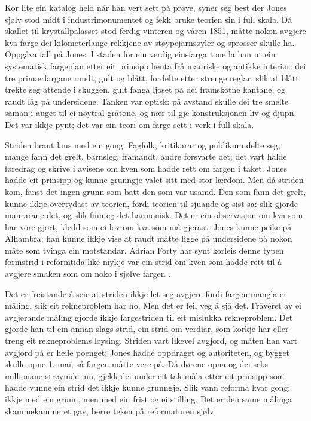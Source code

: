 Kor lite ein katalog held når han vert sett på prøve, syner seg best der Jones sjølv stod midt i industrimonumentet og fekk bruke teorien sin i full skala. Då skallet til krystallpalasset stod ferdig vinteren og våren 1851, måtte nokon avgjere kva farge dei kilometerlange rekkjene av støypejarnsøyler og sprosser skulle ha. Oppgåva fall på Jones. I staden for ein verdig einsfarga tone la han ut ein systematisk fargeplan etter eit prinsipp henta frå mauriske og antikke interiør: dei tre primærfargane raudt, gult og blått, fordelte etter strenge reglar, slik at blått trekte seg attende i skuggen, gult fanga ljoset på dei framskotne kantane, og raudt låg på undersidene. Tanken var optisk: på avstand skulle dei tre smelte saman i auget til ei nøytral gråtone, og nær til gje konstruksjonen liv og djupn. Det var ikkje pynt; det var ein teori om farge sett i verk i full skala.

Striden braut laus med ein gong. Fagfolk, kritikarar og publikum delte seg; mange fann det grelt, barnsleg, framandt, andre forsvarte det; det vart halde føredrag og skrive i avisene om kven som hadde rett om fargen i taket. Jones hadde eit prinsipp og kunne grunngje valet sitt med stor lærdom. Men då striden kom, fanst det ingen grunn som batt den som var usamd. Den som fann det grelt, kunne ikkje overtydast av teorien, fordi teorien til sjuande og sist sa: slik gjorde maurarane det, og slik finn eg det harmonisk. Det er ein observasjon om kva som har vore gjort, kledd som ei lov om kva som må gjerast. Jones kunne peike på Alhambra; han kunne ikkje vise at raudt måtte ligge på undersidene på nokon måte som tvinga ein motstandar. Adrian Forty har synt korleis denne typen formstrid i reformtida like mykje var ein strid om kven som hadde rett til å avgjere smaken som om noko i sjølve fargen \autocite{forty1986}.

Det er freistande å seie at striden ikkje let seg avgjere fordi fargen mangla ei måling, slik eit rekneproblem har ho. Men det er feil veg å sjå det. Fråvêret av ei avgjerande måling gjorde ikkje fargestriden til eit mislukka rekneproblem. Det gjorde han til ein annan slags strid, ein strid om verdiar, som korkje har eller treng eit rekneproblems løysing. Striden vart likevel avgjord, og måten han vart avgjord på er heile poenget: Jones hadde oppdraget og autoriteten, og bygget skulle opne 1. mai, så fargen måtte vere på. Då dørene opna og dei seks millionane strøymde inn, gjekk dei under eit tak måla etter eit prinsipp som hadde vunne ein strid det ikkje kunne grunngje. Slik vann reforma kvar gong: ikkje med ein grunn, men med ein frist og ei stilling. Det er den same målinga skammekammeret gav, berre teken på reformatoren sjølv.

